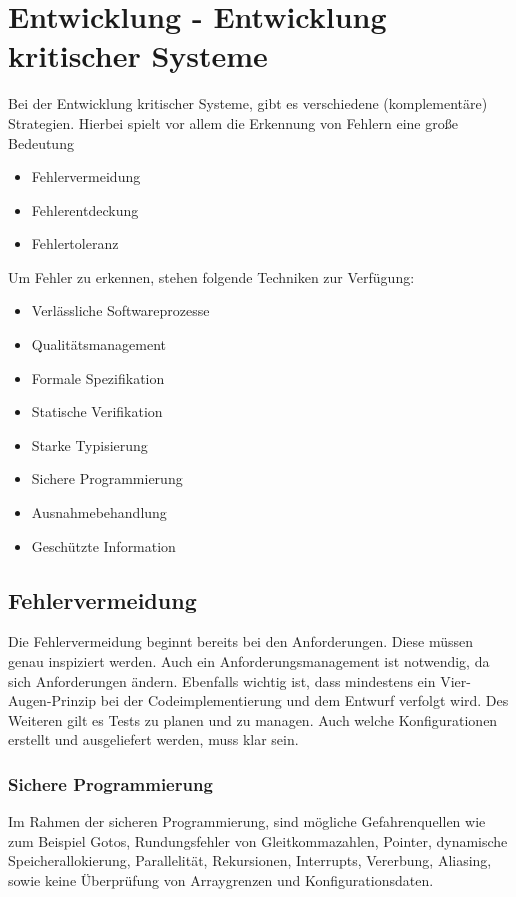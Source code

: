 \section{Entwicklung - Entwicklung kritischer Systeme}
Bei der Entwicklung kritischer Systeme, gibt es verschiedene (komplementäre) Strategien. Hierbei spielt vor allem die Erkennung von Fehlern eine große Bedeutung
\begin{itemize}
\item Fehlervermeidung
\item Fehlerentdeckung
\item Fehlertoleranz
\end{itemize}

Um Fehler zu erkennen, stehen folgende Techniken zur Verfügung:

\begin{itemize}
\item Verlässliche Softwareprozesse
\item Qualitätsmanagement
\item Formale Spezifikation
\item Statische Verifikation
\item Starke Typisierung
\item Sichere Programmierung
\item Ausnahmebehandlung
\item Geschützte Information
\end{itemize}

\subsection{Fehlervermeidung}
Die Fehlervermeidung beginnt bereits bei den Anforderungen. Diese müssen genau inspiziert werden. Auch ein Anforderungsmanagement ist notwendig, da sich Anforderungen ändern.
Ebenfalls wichtig ist, dass mindestens ein Vier-Augen-Prinzip bei der Codeimplementierung und dem Entwurf verfolgt wird. Des Weiteren gilt es Tests zu planen und zu managen. Auch welche Konfigurationen erstellt und ausgeliefert werden, muss klar sein.

\subsubsection{Sichere Programmierung}
Im Rahmen der sicheren Programmierung, sind mögliche Gefahrenquellen wie zum Beispiel Gotos, Rundungsfehler von Gleitkommazahlen, Pointer, dynamische Speicherallokierung, Parallelität, Rekursionen, Interrupts, Vererbung, Aliasing, sowie keine Überprüfung von Arraygrenzen und Konfigurationsdaten. 

